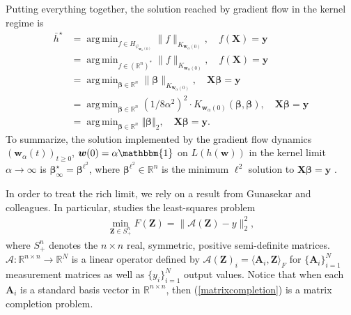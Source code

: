 \documentclass{article}
\DeclareMathOperator*{\argmin}{arg\,min}
\begin{document}
Putting everything together, the solution reached by gradient flow in the kernel regime is
\begin{align*}
    \bar{h}^{\star} &= \argmin_{f \in H_{\varphi_{\boldsymbol{w}_{\alpha}(0)}}} \| f \|_{K_{\boldsymbol{w}_{\alpha}(0)}},\quad f(\boldsymbol{X}) = \boldsymbol{y}\\ &= \argmin_{f \in (\mathbb{R}^n)^*} \| f \|_{K_{\boldsymbol{w}_{\alpha}(0)}},\quad f(\boldsymbol{X}) = \boldsymbol{y}\\
    &= \argmin_{\boldsymbol{\beta} \in \mathbb{R}^n} \| \boldsymbol{\beta} \|_{K_{\boldsymbol{w}_{\alpha}(0)} },\quad \boldsymbol{X}\boldsymbol{\beta} = \boldsymbol{y}\\
    &= \argmin_{\boldsymbol{\beta} \in \mathbb{R}^n} (1/8\alpha^2)^2\cdot K_{\boldsymbol{w}_{\alpha}(0)}(\boldsymbol{\beta},\boldsymbol{\beta}), \quad \boldsymbol{X}\boldsymbol{\beta} = \boldsymbol{y}\\
    &= \argmin_{\boldsymbol{\beta} \in \mathbb{R}^n} \Vert \boldsymbol{\beta} \Vert_2, \quad \boldsymbol{X}\boldsymbol{\beta} = \boldsymbol{y}.
\end{align*}
To summarize, the solution implemented by the gradient flow dynamics $(\boldsymbol{w}_{\alpha}(t))_{t \geq 0}$, $\boldsymbol{w}(0) = \alpha \mathbbm{1}$ on $L(h(\boldsymbol{w}))$ in the kernel limit $\alpha \rightarrow \infty$ is $\boldsymbol{\beta}_{\infty}^{\star} = \boldsymbol{\beta}^{\ell^2}$, where $\boldsymbol{\beta}^{\ell^2} \in \mathbb{R}^n$ is the minimum $\ell^2$ solution to $\boldsymbol{X} \boldsymbol{\beta} = \boldsymbol{y}$ \cite{woodworth2020kernel}.

In order to treat the rich limit, we rely on a result from Gunasekar and colleagues. In particular, \cite{gunasekar2018implicit} studies the least-squares problem
\begin{align}\label{matrixcompletion}
    \min_{\boldsymbol{Z} \in S_+^n} F(\boldsymbol{Z}) = \| \mathcal{A}(\boldsymbol{Z}) - y \|_2^2,
\end{align}
where $S_+^n$ denotes the $n \times n$ real, symmetric, positive semi-definite matrices. $\mathcal{A}: \mathbb{R}^{n \times n} \rightarrow \mathbb{R}^N$ is a linear operator defined by $\mathcal{A}(\boldsymbol{Z})_i = \langle \boldsymbol{A}_i, \boldsymbol{Z} \rangle_F$ for $\{ \boldsymbol{A}_i \}_{i=1}^N$ measurement matrices as well as $\{ y_i \}_{i=1}^N$ output values. Notice that when each $\boldsymbol{A}_i$ is a standard basis vector in $\mathbb{R}^{n \times n}$, then (\ref{matrixcompletion}) is a matrix completion problem.
\end{document}
